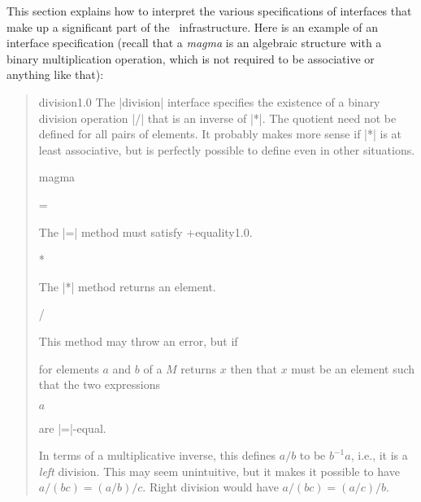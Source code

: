 \documentclass{mtmtcl}
\theoremstyle{plain}
\theoremstyle{remark}
\begin{document}
This section explains how to interpret the various specifications of 
interfaces that make up a significant part of the \mtl\ 
infrastructure.
Here is an example of an interface specification (recall that a 
\emph{magma} is an algebraic structure with a binary multiplication 
operation, which is not required to be associative or anything like 
that):
\begin{quote}
  \small\leavevmode
  \begin{APIspec}{division}{1.0}
    The |division| interface specifies the existence of a binary 
    division operation |/| that is an inverse of |*|. The quotient 
    need not be defined for all pairs of elements. It probably makes 
    more sense if |*| is at least associative, but is perfectly 
    possible to define even in other situations.
    \begin{APIdescription}{magma}
      \begin{APImethod}{=}
         
      \end{APImethod}
        The |=| method must satisfy \APIref+{equality}{1.0}.
      \begin{APImethod}{*}
         
      \end{APImethod}
        The |*| method returns an element.
      \begin{APImethod}{/}
         
      \end{APImethod}
        This method may throw an error, but if
        \begin{displaysyntax}
          [$M$ / $a$ $b$]
        \end{displaysyntax}
        for elements $a$ and $b$ of a  $M$ returns $x$ 
        then that $x$ must be an element such that the two expressions
        \begin{displaysyntax}
          [$M$ * $b$ $x$]\par
          $a$
        \end{displaysyntax}
        are |=|-equal.
        
        \begin{remark}
          In terms of a multiplicative inverse, this defines $a/b$ 
          to be $b^{-1}a$, i.e., it is a \emph{left} division. This 
          may seem unintuitive, but it makes it possible to have 
          \(a/(bc) = (a/b)/c\). Right division would have \(a/(bc) = 
          (a/c)/b\).
        \end{remark}
        

\end{APIdescription}
\end{APIspec}
\end{quote}
\end{document}
